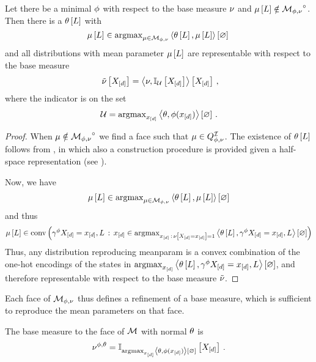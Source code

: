 \begin{theorem}\label{the:faceToArgmax}
	Let there be a minimal $\phi$ with respect to the base measure $\nu$ and $\mu\left[L\right]\notin{\mathcal{M}_{\phi,\nu}}^{\circ}$.
	Then there is a $\theta\left[L\right]$ with 
		\[ \mu\left[L\right] \in \mathrm{argmax}_{\mu\in\mathcal{M}_{\phi,\nu}} \left\langle \theta\left[L\right],\mu\left[L\right]\right\rangle \left[ \varnothing \right] \,  \]
	and all distributions with mean parameter $\mu\left[L\right]$ are representable with respect to the base measure
		\[ \secbasemeasureat{\shortcatvariables} = \contractionof{\basemeasure, \indicatorofat{\arbset}{\shortcatvariables}}{\shortcatvariables} \, , \]
	where the indicator is on the set
		\[ \mathcal{U} = \mathrm{argmax}_{x_{[d]}} \left\langle \theta,\phi(x_{[d]})\right\rangle \left[ \varnothing \right]  \, . \]
\end{theorem}
\begin{proof}
	When $\mu\notin{\mathcal{M}_{\phi,\nu}}^{\circ}$ we find a face such that $\mu\in Q^{\mathcal{I}}_{\phi,\nu}$.
	The existence of $\theta\left[L\right]$ follows from , in which also a construction procedure is provided given a half-space representation (see ).
	
	Now, we have 
	\begin{align*}
		 \mu\left[L\right] \in \mathrm{argmax}_{\mu\in\mathcal{M}_{\phi,\nu}} \left\langle \theta\left[L\right],\mu\left[L\right]\right\rangle \left[ \varnothing \right] 
	\end{align*}
	and thus 
	\begin{align*}
		 \mu\left[L\right] \in \mathrm{conv}\left( \gamma^{\phi}{X_{[d]}=x_{[d]},L} \, : \, 
		 x_{[d]} \in \mathrm{argmax}_{x_{[d]} \, : \, \nu\left[X_{[d]}=x_{[d]}\right]=1} \left\langle \theta\left[L\right],\gamma^{\phi}{X_{[d]}=x_{[d]},L}\right\rangle \left[ \varnothing \right] \right)
	\end{align*}	
	Thus, any distribution reproducing meanparam is a convex combination of the one-hot encodings of the states in $\mathrm{argmax}_{x_{[d]}} \left\langle \theta\left[L\right],\gamma^{\phi}{X_{[d]}=x_{[d]},L}\right\rangle \left[ \varnothing \right]$, and therefore representable with respect to the base measure $\tilde{\nu}$.
\end{proof}

Each face of $\mathcal{M}_{\phi,\nu}$ thus defines a refinement of a base measure, which is sufficient to reproduce the mean parameters on that face.

\begin{definition}\label{def:faceBaseMeasure}
	The base measure to the face of $\mathcal{M}$ with normal $\theta$ is
		\[ \nu^{\phi,\theta} = \mathbb{I}_{\mathrm{argmax}_{x_{[d]}} \left\langle \theta,\phi(x_{[d]})\right\rangle \left[ \varnothing \right]}\left[X_{[d]}\right] \, . \]
\end{definition}

